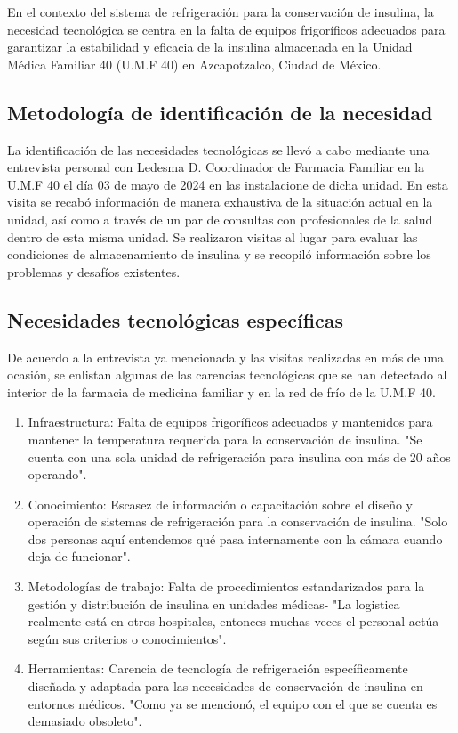  En el contexto del sistema de refrigeración para la conservación de insulina, la necesidad tecnológica se centra en la falta de equipos frigoríficos adecuados para garantizar la estabilidad y eficacia de la insulina almacenada en  la Unidad Médica Familiar 40 (U.M.F 40) en Azcapotzalco, Ciudad de México.
\subsection{Metodología de identificación de la necesidad}
La identificación de las necesidades tecnológicas se llevó a cabo mediante una entrevista personal con Ledesma D. Coordinador de Farmacia Familiar en la U.M.F 40 el día 03 de mayo de 2024 en las instalacione de dicha unidad. En esta visita se recabó información de manera exhaustiva de la situación actual en la unidad, así como a través de un par de consultas con profesionales de la salud dentro de esta misma unidad. Se realizaron visitas al lugar para evaluar las condiciones de almacenamiento de insulina y se recopiló información sobre los problemas y desafíos existentes.


\subsection{Necesidades tecnológicas específicas}
De acuerdo a la entrevista ya mencionada y las visitas realizadas en más de una ocasión, se enlistan algunas de las carencias tecnológicas que se han detectado al interior de la farmacia de medicina familiar y en la red de frío de la U.M.F 40.
\begin{enumerate}
\item Infraestructura: Falta de equipos frigoríficos adecuados y mantenidos para mantener la temperatura requerida para la conservación de insulina. "Se cuenta con una sola unidad de refrigeración para insulina con más de 20 años operando".  
\item Conocimiento: Escasez de información o capacitación sobre el diseño y operación de sistemas de refrigeración para la conservación de insulina. "Solo dos personas aquí entendemos qué pasa internamente con la cámara cuando deja de funcionar". 
\item Metodologías de trabajo: Falta de procedimientos estandarizados para la gestión y distribución de insulina en unidades médicas- "La logistica realmente está en otros hospitales, entonces muchas veces el personal actúa según sus criterios o conocimientos". \cite{david-umf}
\item Herramientas: Carencia de tecnología de refrigeración específicamente diseñada y adaptada para las necesidades de conservación de insulina en entornos médicos. "Como ya se mencionó, el equipo con el que se cuenta es demasiado obsoleto". \cite{david-umf}

\end{enumerate}\rsp
